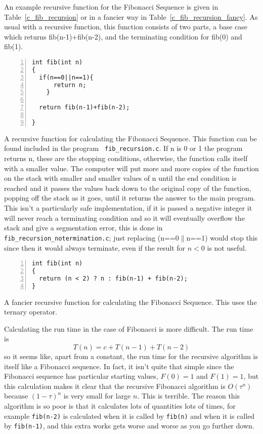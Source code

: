 \documentclass[11pt,a4paper]{scrartcl}
\begin{document}
An example recursive function for the Fibonacci Sequence is given in
Table~\ref{c_fib_recursion} or in a fancier way in
Table~\ref{c_fib_recursion_fancy}.  As usual with a recursive
function, this function consists of two parts, a base case which
returns fib(n-1)+fib(n-2), and the terminating condition for fib(0)
and fib(1).

\begin{table}
\begin{lstlisting}[numbers=left]
int fib(int n)
{
  if(n==0||n==1){
      return n;
    }

  return fib(n-1)+fib(n-2);

}
\end{lstlisting}
\caption{A recursive function for calculating the Fibonacci
  Sequence. This function can be found included in the program {\tt
    fib\_recursion.c}. If n is 0 or 1 the program returns n, these are
  the stopping conditions, otherwise, the function calls itself with a
  smaller value. The computer will put more and more copies of the
  function on the stack with smaller and smaller values of n until the
  end condition is reached and it passes the values back down to the
  original copy of the function, popping off the stack as it goes,
  until it returns the answer to the main program. This isn't a
  particularly safe implementation, if it is passed a negative integer
  it will never reach a terminating condition and so it will
  eventually overflow the stack and give a segmentation error, this is
  done in {\tt fib\_recursion\_no\-termination.c}; just replacing
  (n==0$\|$n==1) would stop this since then it would always terminate,
  even if the result for $n<0$ is not useful.\label{c_fib_recursion}}
\end{table}


\begin{table}
\begin{lstlisting}[numbers=left]
int fib(int n)
{
  return (n < 2) ? n : fib(n-1) + fib(n-2); 
}
\end{lstlisting}
\caption{A fancier recursive function for calculating the Fibonacci Sequence. This uses the ternary operator. \label{c_fib_recursion_fancy}}
\end{table}

Calculating the run time in the case of Fibonacci is more
difficult. The run time is
\begin{equation}
T(n)=c+T(n-1)+T(n-2)
\end{equation}
so it seems like, apart from a constant, the run time for the
recursive algorithm is itself like a Fibonacci sequence. In fact, it
isn't quite that simple since the Fibonacci sequence has particular
starting values, $F(0)=1$ and $F(1)=1$, but this calculation makes it
clear that the recursive Fibonacci algorithm is $O(\tau^n)$ because
$(1-\tau)^n$ is very small for large $n$. This is terrible. The reason
this algorithm is so poor is that it calculates lots of quantities
lots of times, for example \texttt{fib(n-2)} is calculated when it is
called by \texttt{fib(n)} and when it is called by \texttt{fib(n-1)},
and this extra works gets worse and worse as you go further down.
\end{document}
